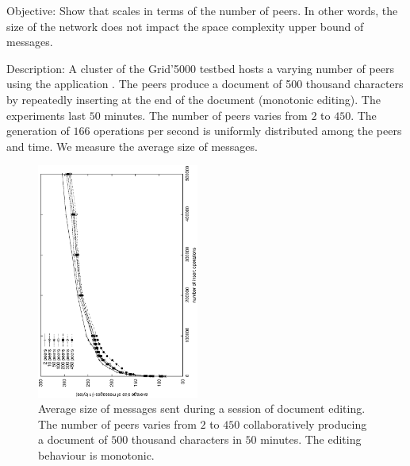 \begin{asparadesc}
\item [Objective:] Show that \CRATE scales in terms of the number of
  peers. In other words, the size of the network does not impact the space
  complexity upper bound of messages.
\item [Description:] A cluster of the Grid'5000 testbed hosts a varying number
  of peers using the application \CRATE. The peers produce a
  document of 500 thousand characters by repeatedly inserting at the end of the
  document (monotonic editing). The experiments last $50$ minutes. The number
  of peers varies from $2$ to $450$. The generation of $166$ operations
  per second is uniformly distributed among the peers and time. We measure the
  average size of messages.

\begin{figure}
  \centering
  \includegraphics[angle=-90,width=0.475\textwidth]{./img/scalability.eps}
  \caption{\label{fig:scalability}Average size of messages sent during a
    session of document editing. The number of peers varies from $2$ to $450$
    collaboratively producing a document of $500$ thousand characters in $50$
    minutes. The editing behaviour is monotonic.}
\end{figure}


\end{asparadesc}

